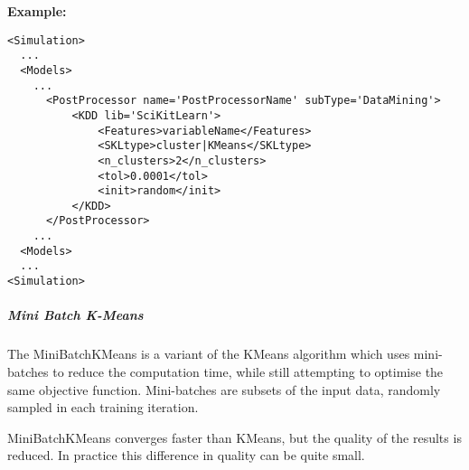 \textbf{Example:}
\begin{lstlisting}[style=XML,morekeywords={subType}]
<Simulation>
  ...
  <Models>
    ...
      <PostProcessor name='PostProcessorName' subType='DataMining'>
          <KDD lib='SciKitLearn'>
              <Features>variableName</Features>
              <SKLtype>cluster|KMeans</SKLtype>
              <n_clusters>2</n_clusters>
              <tol>0.0001</tol>
              <init>random</init>
          </KDD>
      </PostProcessor>
    ...
  <Models>
  ...
<Simulation>
\end{lstlisting}


\subparagraph{  Mini Batch K-Means } \hfill
\label{subparagraph:MiniBatch}

The MiniBatchKMeans is a variant of the KMeans algorithm which uses
mini-batches to reduce the computation time, while still attempting
 to optimise the same objective function. Mini-batches are subsets of
 the input data, randomly sampled in each training iteration.

MiniBatchKMeans converges faster than KMeans, but the quality of the
results is reduced. In practice this difference in quality can be
 quite small.

